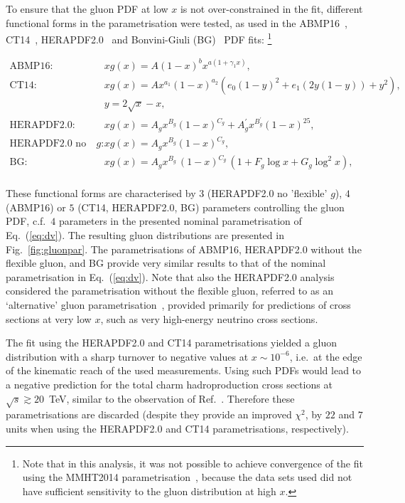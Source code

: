To ensure that the gluon PDF at low $x$ is not over-constrained in the fit, different functional forms in the parametrisation were tested, as used in the ABMP16~\cite{Alekhin:2017kpj}, CT14~\cite{Dulat:2015mca}, HERAPDF2.0~\cite{Abramowicz:2015mha} and Bonvini-Giuli (BG)~\cite{Bonvini:2019wxf} PDF fits:%
\footnote{Note that in this analysis, it was not possible to achieve convergence of the fit using the MMHT2014 parametrisation~\cite{Harland-Lang:2014zoa}, because the data sets used did not have sufficient sensitivity to the gluon distribution at high $x$.}

\begin{equation}
\begin{aligned}
\textrm{ABMP16:}~~~~~~ &xg(x)=A (1 - x)^b x^{a (1 + \gamma_{1} x)},\\
\textrm{CT14:}~~~~~~ &xg(x) = Ax^{a_1}(1-x)^{a_2}(e_0(1-y)^2+e_1(2y(1-y))+y^2), \\
 ~~~~~~ &y=2\sqrt{x}-x,\\
\textrm{HERAPDF2.0:}~~~~~~ &xg(x)=A_gx^{B_g}(1-x)^{C_g}+A^{\prime}_gx^{B^{\prime}_g}(1-x)^{25},\\
\textrm{HERAPDF2.0 no flex. $g$:}~~~~~~ &xg(x)=A_gx^{B_g}(1-x)^{C_g},\\
\textrm{BG:}~~~~~~ &xg(x)=A_{g} x^{B_{g}}\,(1-x)^{C_{g}}\, (1 + F_{g} {\log x} + G_{g} {\log^2 x}),\\
\end{aligned}
\label{eq:gluonpar}
\end{equation}

These functional forms are characterised by $3$ (HERAPDF2.0 no 'flexible' $g$), $4$ (ABMP16) or $5$ (CT14, HERAPDF2.0, BG) parameters controlling the gluon PDF, c.f.\ $4$ parameters in the presented nominal parametrisation of Eq.~(\ref{eq:dv}). 
The resulting gluon distributions are presented in Fig.~\ref{fig:gluonpar}. The parametrisations of ABMP16, HERAPDF2.0 without the flexible gluon, and BG provide very similar results to that of the nominal parametrisation in Eq.~(\ref{eq:dv}). 
Note that also the HERAPDF2.0 analysis considered the parametrisation without the flexible gluon, referred to as an `alternative' gluon parametrisation~\cite{Abramowicz:2015mha}, provided primarily for predictions of cross sections at very low $x$, such as very high-energy neutrino cross sections.

The fit using the HERAPDF2.0 and CT14 parametrisations yielded a gluon distribution with a sharp turnover to negative values at $x \sim 10^{-6}$, i.e.\ at the edge of the kinematic reach of the used measurements. Using such PDFs would lead to a negative prediction for the total charm hadroproduction cross sections at $\sqrt{s} \gtrsim 20$~TeV, similar to the observation of Ref.~\cite{Accardi:2016ndt}. Therefore these parametrisations are discarded (despite they provide an improved $\chi^2$, by $22$ and $7$ units when using the HERAPDF2.0 and CT14 parametrisations, respectively).

